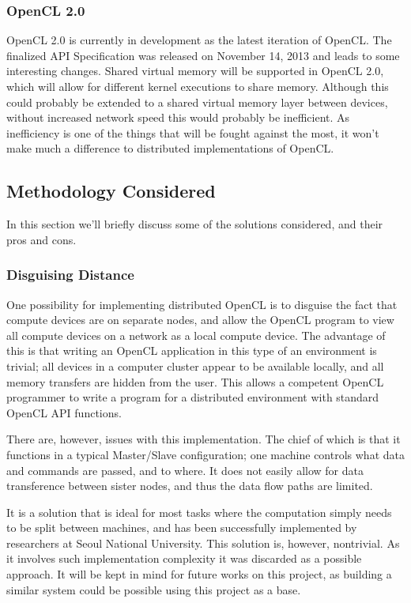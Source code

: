 \documentclass[../thesis.tex]{subfiles}
\begin{document}
        \subsubsection{OpenCL 2.0} %
        \label{ssub:opencl_2_0}
        OpenCL 2.0 is currently in development as the latest iteration of OpenCL. The finalized API Specification was released on November 14, 2013 and leads to some interesting changes. Shared virtual memory will be supported in OpenCL 2.0, which will allow for different kernel executions to share memory. Although this could probably be extended to a shared virtual memory layer between devices, without increased network speed this would probably be inefficient. As inefficiency is one of the things that will be fought against the most, it won't make much a difference to distributed implementations of OpenCL.

    \subsection{Methodology Considered} %
    \label{sub:methodology_considered}
    In this section we'll briefly discuss some of the solutions considered, and their pros and cons.
        \subsubsection{Disguising Distance} %
        \label{ssub:disguising_distance}
            One possibility for implementing distributed OpenCL is to disguise the fact that compute devices are on separate nodes, and allow the OpenCL program to view all compute devices on a network as a local compute device. The advantage of this is that writing an OpenCL application in this type of an environment is trivial; all devices in a computer cluster appear to be available locally, and all memory transfers are hidden from the user. This allows a competent OpenCL programmer to write a program for a distributed environment with standard OpenCL API functions.

            There are, however, issues with this implementation. The chief of which is that it functions in a typical Master/Slave configuration; one machine controls what data and commands are passed, and to where. It does not easily allow for data transference between sister nodes, and thus the data flow paths are limited.

            It is a solution that is ideal for most tasks where the computation simply needs to be split between machines, and has been successfully implemented by researchers at Seoul National University\cite{Kim:2012:SOF:2304576.2304623}. This solution is, however, nontrivial. As it involves such implementation complexity it was discarded as a possible approach. It will be kept in mind for future works on this project, as building a similar system could be possible using this project as a base.
\end{document}
